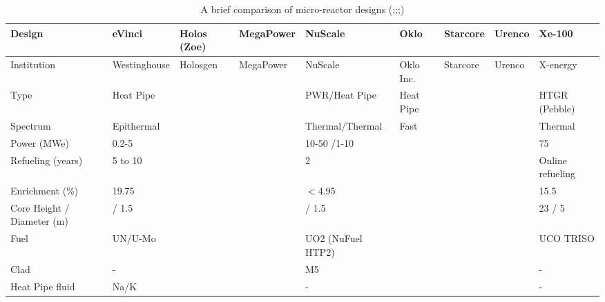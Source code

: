 \documentclass[10pt,a4paper]{article}
\begin{document}
\pagebreak
{}
\begin{landscape}
\begin{table} [ht]
\begin{center}

\caption{A brief comparison of micro-reactor designs (\cite{Yan20};\cite{Arafat19};\cite{Levinsky18};\cite{IAEA18})}
\begin{tabular}{|l|l|l|l|l|l|l|l|l|}
\hline 
Design 		&eVinci 		& Holos (Zoe)		&MegaPower 	& NuScale		& Oklo 		& Starcore		& Urenco 		& Xe-100 \\ 
\hline 
Institution 	&Westinghouse& Holosgen	&MegaPower	& NuScale		& Oklo Inc. 	& Starcore		& Urenco 		& X-energy \\ 
\hline 
Type			&Heat Pipe	&   		  	&  		& PWR/Heat Pipe&Heat Pipe   			&				&   			& HTGR (Pebble)\\ 
\hline 
Spectrum		&Epithermal	&  		 	&  	&Thermal/Thermal 		&Fast   			&   			&			&Thermal\\ 
\hline 
Power (MWe)	&0.2-5		&   			&			& 10-50 /1-10			&   			&   			&			&75\\ 
\hline
Refueling (years)&5 to 10		&   			&			& 2 			&   			&   			&			&Online refueling\\ 
\hline
Enrichment (\%)&19.75		&   			&			& $<$4.95 		&   			&   			&			&15.5\\ 
\hline
Core Height / Diameter (m)	&/ 1.5		&   			&			& / 1.5 		&   			&   			&			&23 / 5\\ 
\hline
Fuel			&UN/U-Mo	&   			&			&UO2 (NuFuel HTP2)		&   			&   			&			&UCO TRISO\\ 
\hline
Clad			&-		&   			&			& M5 		&   			&   			&			&-\\ 
\hline
Heat Pipe fluid	&Na/K	&   			&			& - 		&   			&   			&			&-\\ 
\hline
\end{tabular}


\end{center}
\end{table}
\end{landscape}
\end{document}
